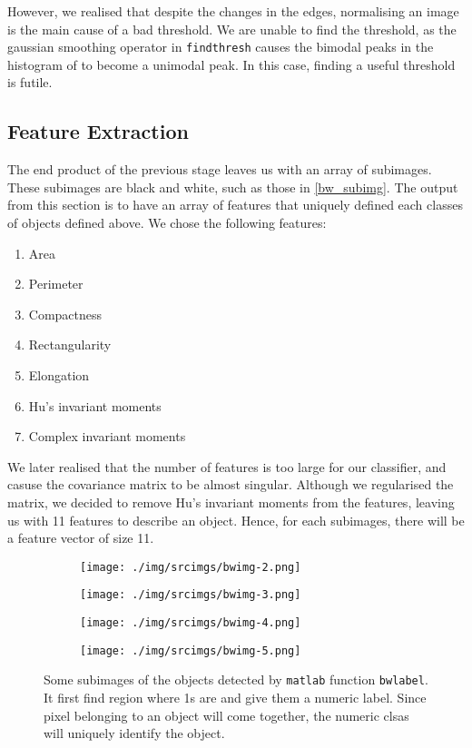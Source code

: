 \documentclass[main.tex]{subfiles}
\begin{document}
However, we realised that despite the changes in the edges, normalising an image is the main cause of a bad threshold. We are unable to find the threshold, as the gaussian smoothing operator in \texttt{findthresh} causes the bimodal peaks in the histogram of to become a unimodal peak. In this case, finding a useful threshold is futile.

\subsection{Feature Extraction}
The end product of the previous stage leaves us with an array of subimages. These subimages are black and white, such as those in \autoref{bw_subimg}. The output from this section is to have an array of features that uniquely defined each classes of objects defined above. We chose the following features:

\begin{enumerate}
  \item Area
  \item Perimeter
  \item Compactness
  \item Rectangularity
  \item Elongation
  \item Hu's invariant moments
  \item Complex invariant moments
\end{enumerate}

We later realised that the number of features is too large for our classifier, and casuse the covariance matrix to be almost singular. Although we regularised the matrix, we decided to remove Hu's invariant moments from the features, leaving us with 11 features to describe an object. Hence, for each subimages, there will be a feature vector of size 11.

\begin{figure}[!h]
  \centering
  \begin{subfigure}[b]{.2\textwidth}
    \centering
    \texttt{[image: ./img/srcimgs/bwimg-2.png]}
  \end{subfigure}
  \begin{subfigure}[b]{.2\textwidth}
    \centering
    \texttt{[image: ./img/srcimgs/bwimg-3.png]}
  \end{subfigure}
  \begin{subfigure}[b]{.2\textwidth}
    \centering
    \texttt{[image: ./img/srcimgs/bwimg-4.png]}
  \end{subfigure}
  \begin{subfigure}[b]{.2\textwidth}
    \centering
    \texttt{[image: ./img/srcimgs/bwimg-5.png]}
  \end{subfigure}
  \caption{Some subimages of the objects detected by \texttt{matlab} function \texttt{bwlabel}. It first find region where 1s are and give them a numeric label. Since pixel belonging to an object will come together, the numeric clsas will uniquely identify the object.}
  \label{bw_subimg}
\end{figure}
\end{document}
